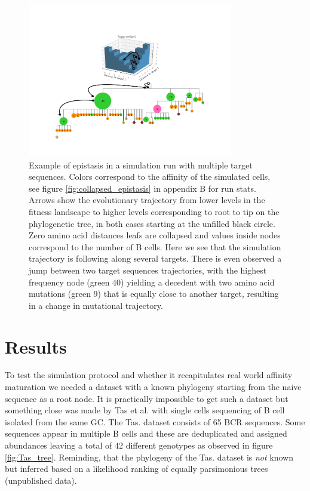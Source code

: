 \begin{figure}[!ht]
    \begin{center}
    \includegraphics[width=0.8\textwidth]{figures/epistasis_figure.pdf}
        \caption{
        \label{fig:epistasis_figure}
        Example of epistasis in a simulation run with multiple target sequences.
        Colors correspond to the affinity of the simulated cells, see figure \ref{fig:collapsed_epistasis} in appendix B for run stats.
        Arrows show the evolutionary trajectory from lower levels in the fitness landscape to higher levels corresponding to root to tip on the phylogenetic tree, in both cases starting at the unfilled black circle.
        Zero amino acid distances leafs are collapsed and values inside nodes correspond to the number of B cells.
        Here we see that the simulation trajectory is following along several targets.
        There is even observed a jump between two target sequences trajectories, with the highest frequency node (green 40) yielding a decedent with two amino acid mutations (green 9) that is equally close to another target, resulting in a change in mutational trajectory.
        }
    \end{center}
\end{figure}








\section{Results}
To test the simulation protocol and whether it recapitulates real world affinity maturation we needed a dataset with a known phylogeny starting from the naive sequence as a root node.
It is practically impossible to get such a dataset but something close was made by Tas et al. \cite{tas2016visualizing} with single cells sequencing of B cell isolated from the same GC.
The Tas. dataset consists of 65 BCR sequences.
Some sequences appear in multiple B cells and these are deduplicated and assigned abundances leaving a total of 42 different genotypes as observed in figure \ref{fig:Tas_tree}.
Reminding, that the phylogeny of the Tas. dataset is \textit{not} known but inferred based on a likelihood ranking of equally parsimonious trees (unpublished data).

